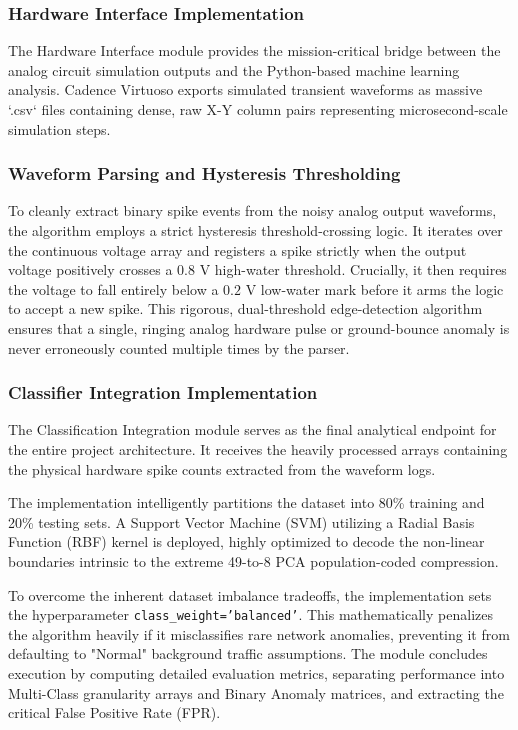 \documentclass{ieeeaccess}
\begin{document}
\subsubsection{Hardware Interface Implementation}

The Hardware Interface module provides the mission-critical bridge between the analog circuit simulation outputs and the Python-based machine learning analysis. Cadence Virtuoso exports simulated transient waveforms as massive `.csv` files containing dense, raw X-Y column pairs representing microsecond-scale simulation steps.

\subsubsection{Waveform Parsing and Hysteresis Thresholding}
To cleanly extract binary spike events from the noisy analog output waveforms, the algorithm employs a strict hysteresis threshold-crossing logic. It iterates over the continuous voltage array and registers a spike strictly when the output voltage positively crosses a $0.8\text{ V}$ high-water threshold. Crucially, it then requires the voltage to fall entirely below a $0.2\text{ V}$ low-water mark before it arms the logic to accept a new spike. This rigorous, dual-threshold edge-detection algorithm ensures that a single, ringing analog hardware pulse or ground-bounce anomaly is never erroneously counted multiple times by the parser.

\subsubsection{Classifier Integration Implementation}

The Classification Integration module serves as the final analytical endpoint for the entire project architecture. It receives the heavily processed arrays containing the physical hardware spike counts extracted from the waveform logs.

The implementation intelligently partitions the dataset into 80\% training and 20\% testing sets. A Support Vector Machine (SVM) utilizing a Radial Basis Function (RBF) kernel is deployed, highly optimized to decode the non-linear boundaries intrinsic to the extreme 49-to-8 PCA population-coded compression. 

To overcome the inherent dataset imbalance tradeoffs, the implementation sets the hyperparameter \texttt{class\_weight='balanced'}. This mathematically penalizes the algorithm heavily if it misclassifies rare network anomalies, preventing it from defaulting to "Normal" background traffic assumptions. The module concludes execution by computing detailed evaluation metrics, separating performance into Multi-Class granularity arrays and Binary Anomaly matrices, and extracting the critical False Positive Rate (FPR).
\end{document}
